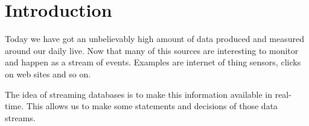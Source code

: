 \chapter{Introduction}
\label{introduction}

Today we have got an unbelievably high amount of data produced and measured around our daily live. Now that many of this sources are interesting to monitor and happen as a stream of events. Examples are internet of thing sensors, clicks on web sites and so on.

The idea of streaming databases is to make this information available in real-time. This allows us to make some statements and decisions of those data streams.